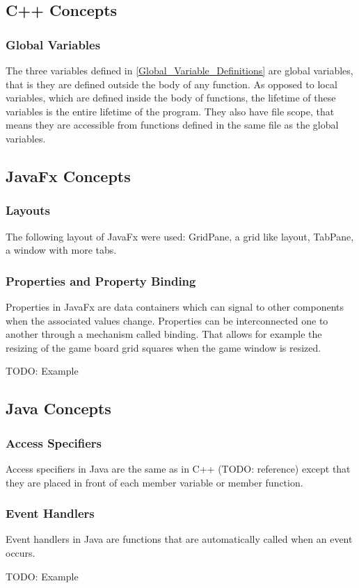 \subsection{C++ Concepts}

\subsubsection{Global Variables} 

The three variables defined in \ref{Global_Variable_Definitions} are global variables, that is they are defined outside the body of any function. As opposed to local variables, which are defined inside the body of functions, the lifetime of these variables is the entire lifetime of the program. They also have file scope, that means they are accessible from functions defined in the same file as the global variables.

\subsection{JavaFx Concepts}

\subsubsection{Layouts}

The following layout of JavaFx were used: GridPane, a grid like layout, TabPane, a window with more tabs.

\subsubsection{Properties and Property Binding}

Properties in JavaFx are data containers which can signal to other components when the associated values change. Properties can be interconnected one to another through a mechanism called binding. That allows for example the resizing of the game board grid squares when the game window is resized.

TODO: Example

\subsection {Java Concepts}

\subsubsection{Access Specifiers}

Access specifiers in Java are the same as in C++ (TODO: reference) except that they are placed in front of each member variable or member function.

\subsubsection {Event Handlers}

Event handlers in Java are functions that are automatically called when an event occurs.

TODO: Example